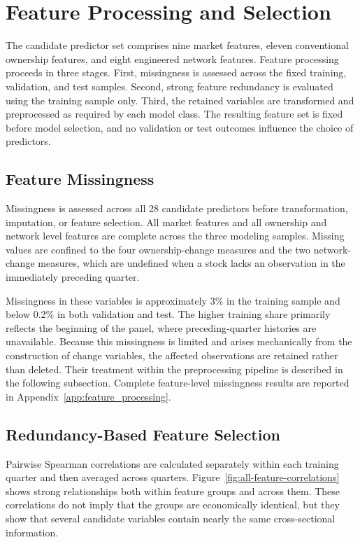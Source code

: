 \section{Feature Processing and Selection}
\label{sec:feature_engineering}

The candidate predictor set comprises nine market features, eleven conventional ownership features, and eight engineered network features. Feature processing proceeds in three stages. First, missingness is assessed across the fixed training, validation, and test samples. Second, strong feature redundancy is evaluated using the training sample only. Third, the retained variables are transformed and preprocessed as required by each model class. The resulting feature set is fixed before model selection, and no validation or test outcomes influence the choice of predictors.

\subsection{Feature Missingness}

Missingness is assessed across all 28 candidate predictors before transformation, imputation, or feature selection. All market features and all ownership and network level features are complete across the three modeling samples. Missing values are confined to the four ownership-change measures and the two network-change measures, which are undefined when a stock lacks an observation in the immediately preceding quarter.

Missingness in these variables is approximately 3\% in the training sample and below 0.2\% in both validation and test. The higher training share primarily reflects the beginning of the panel, where preceding-quarter histories are unavailable. Because this missingness is limited and arises mechanically from the construction of change variables, the affected observations are retained rather than deleted. Their treatment within the preprocessing pipeline is described in the following subsection. Complete feature-level missingness results are reported in Appendix~\ref{app:feature_processing}.

\subsection{Redundancy-Based Feature Selection}

Pairwise Spearman correlations are calculated separately within each training quarter and then averaged across quarters. Figure~\ref{fig:all-feature-correlations} shows strong relationships both within feature groups and across them. These correlations do not imply that the groups are economically identical, but they show that several candidate variables contain nearly the same cross-sectional information.


